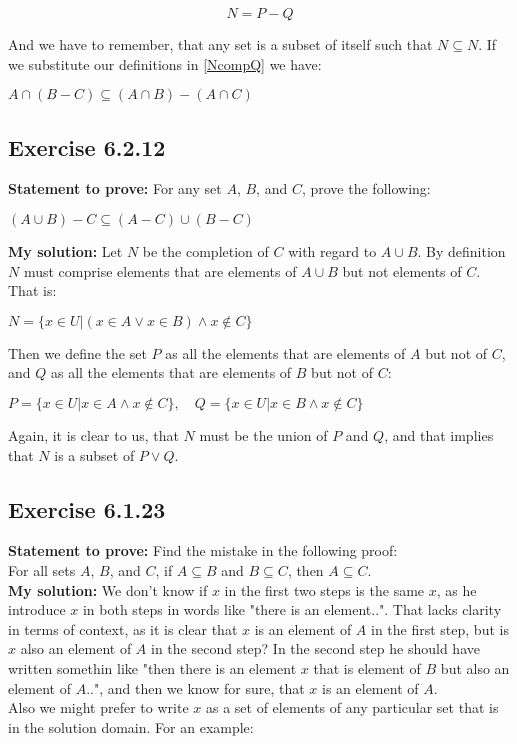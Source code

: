 \documentclass{article}
\newcommand{\cent}[1]{\begin{center}#1\end{center}}
\newcommand{\mat}[2]{\begin{equation} \label{#2}#1\end{equation}}
\newcommand{\In}{\! \in \!}
\newcommand{\Prove}{\textbf{Statement to prove: }}
\newcommand{\Solution}{\textbf{My solution: }}
\newcommand{\QED}{\boxed{}}
\newcommand{\Exercise}[1]{\subsection{Exercise #1}}
\begin{document}
	\mat{N = P-Q}{NcompQ}
	
	And we have to remember, that any set is a subset of itself such that  $N \subseteq N$. If we substitute our definitions in \eqref{NcompQ} we have:
	\cent{$ A \cap (B-C) \subseteq (A \cap B) - (A \cap C) $}
	
	\QED
	
	\Exercise{6.2.12}
	
	\Prove
	For any set $A$, $B$, and $C$, prove the following:
	
	\cent{$(A \cup B) - C \subseteq (A-C) \cup (B-C)$}
	
	\Solution
	Let $N$ be the completion of $C$ with regard  to $A\cup B$. By definition $N$ must comprise elements that are elements of $A \cup B$ but not elements of $C$. That is:
	
	\cent{$ N = \{x \In U | (x \In A \vee x \In B) \wedge x \notin C\} $}
	
	Then we define the set $P$ as all the elements that are elements of $A$ but not of $C$, and $Q$ as all the elements that are elements of $B$ but not of $C$:
	
	\cent{$P = \{x \In U | x \In A \wedge x \notin C\}, \quad Q = \{x \In U | x \In B \wedge x \notin C\}$}
	
	Again, it is clear to us, that $N$ must be the union of $P$ and $Q$, and that implies that $N$ is a subset of $P \vee Q$.\\
	\QED
	
	\Exercise{6.1.23}
	
	\Prove
	Find the mistake in the following proof:\\
	
	For all sets $A$, $ B $, and $ C $, if $ A \subseteq B $ and $ B \subseteq C $, then $ A \subseteq C $.\\
	
	\Solution
	We don't know if $x$ in the first two steps is the same $x$, as he introduce $x$ in both steps in words like  "there is an element..". That lacks clarity in terms of context, as it is clear that $x$ is an element of  $A$ in the first step, but is $x$ also an element of $A$ in the second step? In the second step he should have written somethin like "then there is an element $ x $ that is element of $ B $ but also an element of $ A $..", and then we know for sure, that $x$ is an element of $A$.\\
	
	Also we might prefer to write $x$ as a set of elements of any particular set that is in the solution domain. For an example:
	
\end{document}
